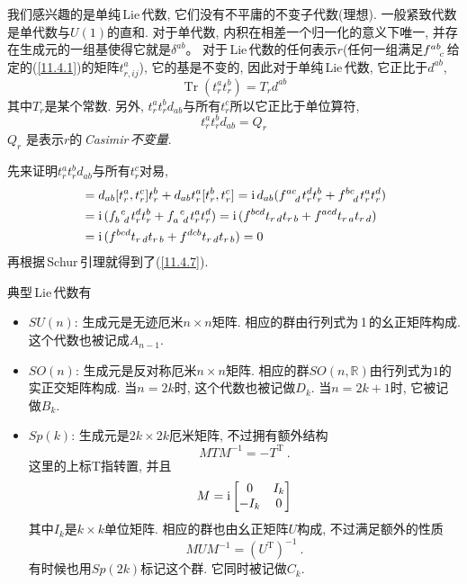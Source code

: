 我们感兴趣的是单纯\,Lie\,代数, 它们没有不平庸的不变子代数(理想). 一般紧致代数是单代数与$ U(1) $的直和. 对于单代数, 内积在相差一个归一化的意义下唯一, 并存在生成元的一组基使得它就是$ \delta^{ab}$。 对于\,Lie\,代数的任何表示$ r $(任何一组满足$ f\indices{^a^b_c} $给定的(\ref{11.4.1})的矩阵$ t^{a}_{r,ij}$), 它的基是不变的, 因此对于单纯\,Lie\,代数, 它正比于$ d^{ab}$,
\begin{equation}
    \operatorname{Tr}(t_{r}^{a}t_{r}^{b}) = T_{r}d^{ab} \label{11.4.6}
\end{equation}
其中$ T_{r} $是某个常数. 另外, $t_{r}^{a}t_{r}^{b}d_{ab} $与所有$ t_{r}^{c} $所以它正比于单位算符,
\begin{equation}
    t_{r}^{a}t_{r}^{b}d_{ab} = Q_{r}  \label{11.4.7}
\end{equation}
$Q_{r}$ 是表示$ r $的\,\emph{Casimir}\,{\emph{不变量}}.
\begin{tcolorbox}
先来证明$ t_{r}^{a}t_{r}^{b}d_{ab} $与所有$ t_{r}^{c} $对易, 
\begin{align*}
    [d_{ab}t_{r}^{a}t_{r}^{b},t_{r}^{c}] &= d_{ab}[t_{r}^{a},t_{r}^{c}]t_{r}^{b} 
    + d_{ab}t_{r}^{a}[t_{r}^{b},t_{r}^{c}] 
    =\mi \, d_{ab} (f\indices{^a^c_d}t_{r}^{d}t_{r}^{b}+ f\indices{^b^c_d}t_{r}^{a}t_{r}^{d}) \\
    &=\mi \, (f\indices{_b^c_d}t_{r}^{d}t_{r}^{b}+ f\indices{_a^c_d}t_{r}^{a}t_{r}^{d}) 
    =\mi \, (f\indices{^b^c^d}t_{r\,d}t_{r\,b}+ f\indices{^a^c^d}t_{r\,a}t_{r\,d}) \\
     &=\mi \, (f\indices{^b^c^d}t_{r\,d}t_{r\,b}+ f\indices{^d^c^b}t_{r\,d}t_{r\,b}) =0
\end{align*}
再根据\,Schur\,引理就得到了(\ref{11.4.7}).
\end{tcolorbox}

典型\,Lie\,代数有
\begin{itemize}
    \item $SU(n)$: 生成元是无迹厄米$ n\times n $矩阵. 相应的群由行列式为\,1\,的幺正矩阵构成. 这个代数也被记成$ A_{n-1}$.
    \item $SO(n)$: 生成元是反对称厄米$ n\times n $矩阵. 相应的群$ SO(n,\mathds{R}) $由行列式为$ 1 $的实正交矩阵构成. 当$ n=2k $时, 这个代数也被记做$ D_{k}$. 当$ n=2k+1 $时, 它被记做$ B_{k}$.
    \item $Sp(k)$: 生成元是$ 2k\times 2k $厄米矩阵, 不过拥有额外结构
    \begin{equation}
        M T M^{-1} = - T^{\mathrm{T}} \:. \label{11.4.8}
    \end{equation}
    这里的上标$ \mathrm{T} $指转置, 并且
    \begin{equation}
        M = \mathrm{i} \begin{bmatrix}
        0 & I_{k} \\ -I_{k} & 0 
        \end{bmatrix} \label{11.4.9}
    \end{equation}
    其中$ I_{k} $是$ k\times k $单位矩阵. 相应的群也由幺正矩阵$ U $构成, 不过满足额外的性质
    \begin{equation}
        M U M^{-1} = (U^{\mathrm{T}})^{-1} \:. \label{11.4.10}
    \end{equation}
    有时候也用$ Sp(2k) $标记这个群. 它同时被记做$ C_{k}$.
\end{itemize}

